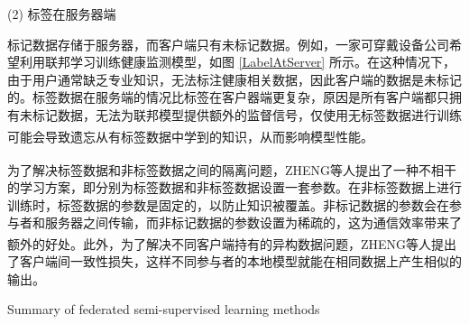 (2) 标签在服务器端

标记数据存储于服务器，而客户端只有未标记数据。例如，一家可穿戴设备公司希望利用联邦学习训练健康监测模型，如图 \ref{LabelAtServer} 所示。在这种情况下，由于用户通常缺乏专业知识，无法标注健康相关数据，因此客户端的数据是未标记的。标签数据在服务端的情况比标签在客户器端更复杂，原因是所有客户端都只拥有未标记数据，无法为联邦模型提供额外的监督信号，仅使用无标签数据进行训练可能会导致遗忘从有标签数据中学到的知识，从而影响模型性能\textsuperscript{\cite{jeong2020federated,diao2022semifl}}。


为了解决标签数据和非标签数据之间的隔离问题，ZHENG\textsuperscript{\cite{jeong2020federated}}等人提出了一种不相干的学习方案，即分别为标签数据和非标签数据设置一套参数。在非标签数据上进行训练时，标签数据的参数是固定的，以防止知识被覆盖。非标记数据的参数会在参与者和服务器之间传输，而非标记数据的参数设置为稀疏的，这为通信效率带来了额外的好处。此外，为了解决不同客户端持有的异构数据问题，ZHENG\textsuperscript{\cite{jeong2020federated}}等人提出了客户端间一致性损失，这样不同参与者的本地模型就能在相同数据上产生相似的输出。

\vspace{-0.1cm}
\begin{table}[h]
	\centering
	{\songti \wuhao Summary of federated semi-supervised learning methods}
	\label{SummaryOfFedSemi}
\end{table}
\vspace{-0.35cm}

